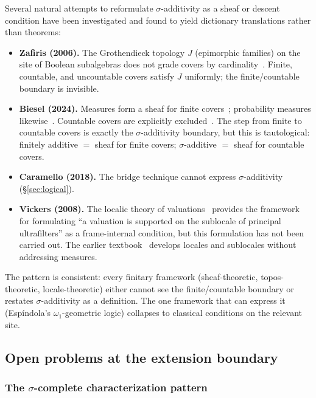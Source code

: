 Several natural attempts to reformulate $\sigma$-additivity as a
sheaf or descent condition have been investigated and found to yield
dictionary translations rather than theorems:

\begin{itemize}
  \item \textbf{Zafiris (2006).}  The Grothendieck topology $J$
    (epimorphic families) on the site of Boolean subalgebras does
    not grade covers by cardinality~\cite{Zafiris2006}.  Finite,
    countable, and uncountable covers satisfy $J$ uniformly; the
    finite/countable boundary is invisible.

  \item \textbf{Biesel (2024).}  Measures form a sheaf for finite
    covers~\cite[Theorem~8]{Biesel2024}; probability measures
    likewise~\cite[Theorem~11]{Biesel2024}.  Countable covers are
    explicitly excluded~\cite[Remark~7]{Biesel2024}.  The step
    from finite to countable covers is exactly the
    $\sigma$-additivity boundary, but this is tautological:
    finitely additive $=$ sheaf for finite covers;
    $\sigma$-additive $=$ sheaf for countable covers.

  \item \textbf{Caramello (2018).}  The bridge technique cannot
    express $\sigma$-additivity (\S\ref{sec:logical}).

  \item \textbf{Vickers (2008).}  The localic theory of
    valuations~\cite{Vickers2008} provides the framework for
    formulating ``a valuation is supported on the sublocale of
    principal ultrafilters'' as a frame-internal condition, but
    this formulation has not been carried out.  The earlier
    textbook~\cite{Vickers1989} develops locales and sublocales
    without addressing measures.
\end{itemize}

The pattern is consistent: every finitary framework (sheaf-theoretic,
topos-theoretic, locale-theoretic) either cannot see the
finite/countable boundary or restates $\sigma$-additivity as a
definition.  The one framework that can express it (Esp\'{i}ndola's
$\omega_1$-geometric logic) collapses to classical conditions on
the relevant site.

\subsection{Open problems at the extension boundary}

\subsubsection{The $\sigma$-complete characterization pattern}

